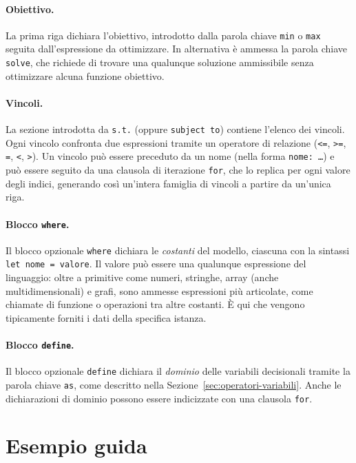 \paragraph{Obiettivo.}
La prima riga dichiara l'obiettivo, introdotto dalla parola chiave \texttt{min}
o \texttt{max} seguita dall'espressione da ottimizzare. In alternativa è
ammessa la parola chiave \texttt{solve}, che richiede di trovare una qualunque
soluzione ammissibile senza ottimizzare alcuna funzione obiettivo.

\paragraph{Vincoli.}
La sezione introdotta da \texttt{s.t.} (oppure \texttt{subject to}) contiene
l'elenco dei vincoli. Ogni vincolo confronta due espressioni tramite un
operatore di relazione (\texttt{<=}, \texttt{>=}, \texttt{=}, \texttt{<},
\texttt{>}). Un vincolo può essere preceduto da un nome (nella forma
\texttt{nome: \ldots}) e può essere seguito da una clausola di iterazione
\texttt{for}, che lo replica per ogni valore degli indici, generando così
un'intera famiglia di vincoli a partire da un'unica riga.

\paragraph{Blocco \texttt{where}.}
Il blocco opzionale \texttt{where} dichiara le \emph{costanti} del modello,
ciascuna con la sintassi \texttt{let nome = valore}. Il valore può essere una
qualunque espressione del linguaggio: oltre a primitive come numeri, stringhe,
array (anche multidimensionali) e grafi, sono ammesse espressioni più
articolate, come chiamate di funzione o operazioni tra altre costanti. È qui che
vengono tipicamente forniti i dati della specifica istanza.

\paragraph{Blocco \texttt{define}.}
Il blocco opzionale \texttt{define} dichiara il \emph{dominio} delle variabili
decisionali tramite la parola chiave \texttt{as}, come descritto nella
Sezione~\ref{sec:operatori-variabili}. Anche le dichiarazioni di dominio
possono essere indicizzate con una clausola \texttt{for}.

\section{Esempio guida}
\label{sec:esempio-guida}

